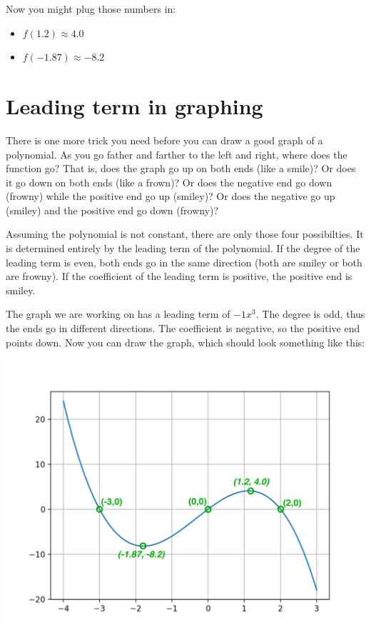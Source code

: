 Now you might plug those numbers in:
\begin{itemize}
\item $f(1.2) \approx 4.0 $
\item $f(-1.87) \approx -8.2$
\end{itemize}

\section{Leading term in graphing}

There is one more trick you need before you can draw a good graph of a
polynomial. As you go father and farther to the left and right, where
does the function go?  That is, does the graph go up on both ends
(like a smile)? Or does it go down on both ends (like a frown)? Or
does the negative end go down (frowny) while the positive end go up
(smiley)? Or does the negative go up (smiley) and the positive end go
down (frowny)?

Assuming the polynomial is not constant, there are only those four
possibilties. It is determined entirely by the leading term of the
polynomial.  If the degree of the leading term is even, both ends go
in the same direction (both are smiley or both are frowny).  If the
coefficient of the leading term is positive, the positive end is
smiley.

The graph we are working on has a leading term of $-1x^3$. The degree is odd, thus the ends go in different directions. The coefficient is negative, so the positive end points down.  Now you can draw the graph, which should look something like this:

\includegraphics[width=\textwidth]{annotated_graph.png}

